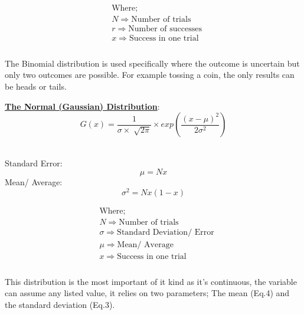 \documentclass[11pt]{article}
\begin{document}
\begin{multicols}{2}
\begin{equation*}
\begin{split}
&\text{Where;} \\
&N \Rightarrow \text{Number of trials} \\
&r \Rightarrow \text{Number of successes} \\
&x \Rightarrow \text{Success in one trial} \\
\end{split}
\end{equation*} \\

The Binomial distribution is used specifically where the outcome is uncertain but only two outcomes are possible. For example tossing a coin, the only results can be heads or tails. 
\end{multicols}

\bigskip

\underline{\textbf{The Normal (Gaussian) Distribution}}:\\

\begin{equation} \label{The Normal (Gaussian) Distribution Equation}
G(x) = \dfrac{1}{\sigma \times \sqrt[]{2 \pi}} \times exp\left(\dfrac{(x-\mu)^2}{2\sigma^2}\right)
\end{equation} \\

\begin{multicols}{2}
Standard Error:
\begin{equation} \label{The N/G Standard Error Equation}
\mu =  Nx
\end{equation}
Mean/ Average:
\begin{equation} \label{The N/G Mean/ Average Distribution Equation}
\sigma ^2 = Nx(1-x)
\end{equation}
\end{multicols}

\begin{multicols}{2}
\begin{equation*}
\begin{split}
&\text{Where;} \\
&N \Rightarrow \text{Number of trials} \\
&\sigma \Rightarrow \text{Standard Deviation/ Error} \\
&\mu \Rightarrow \text{Mean/ Average} \\
&x \Rightarrow \text{Success in one trial} \\
\end{split}
\end{equation*} \\

This distribution is the most important of it kind as it's continuous, the variable can assume any listed value, it relies on two parameters; The mean (Eq.4) and the standard deviation (Eq.3).

\end{multicols} 
\end{document}
